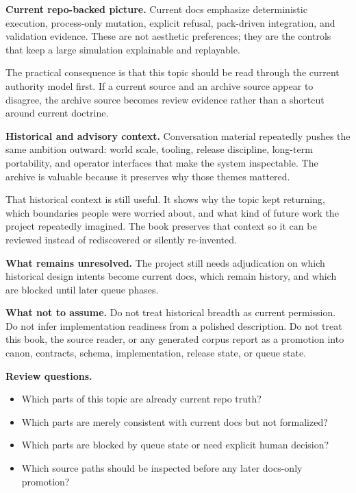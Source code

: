 \documentclass[10.5pt,a4paper,openany]{book}
\begin{document}
\textbf{Current repo-backed picture.} Current docs emphasize deterministic execution, process-\allowbreak{}only mutation, explicit refusal, pack-\allowbreak{}driven integration, and validation evidence.\allowbreak{} These are not aesthetic preferences; they are the controls that keep a large simulation explainable and replayable.\allowbreak{}


The practical consequence is that this topic should be read through the current authority model first.\allowbreak{} If a current source and an archive source appear to disagree, the archive source becomes review evidence rather than a shortcut around current doctrine.\allowbreak{}


\textbf{Historical and advisory context.} Conversation material repeatedly pushes the same ambition outward: world scale, tooling, release discipline, long-\allowbreak{}term portability, and operator interfaces that make the system inspectable.\allowbreak{} The archive is valuable because it preserves why those themes mattered.\allowbreak{}


That historical context is still useful.\allowbreak{} It shows why the topic kept returning, which boundaries people were worried about, and what kind of future work the project repeatedly imagined.\allowbreak{} The book preserves that context so it can be reviewed instead of rediscovered or silently re-\allowbreak{}invented.\allowbreak{}


\textbf{What remains unresolved.} The project still needs adjudication on which historical design intents become current docs, which remain history, and which are blocked until later queue phases.\allowbreak{}


\textbf{What not to assume.} Do not treat historical breadth as current permission.\allowbreak{} Do not infer implementation readiness from a polished description.\allowbreak{} Do not treat this book, the source reader, or any generated corpus report as a promotion into canon, contracts, schema, implementation, release state, or queue state.\allowbreak{}


\textbf{Review questions.}


\begin{itemize}
\item Which parts of this topic are already current repo truth?
\item Which parts are merely consistent with current docs but not formalized?
\item Which parts are blocked by queue state or need explicit human decision?
\item Which source paths should be inspected before any later docs-\allowbreak{}only promotion?
\end{itemize}
\end{document}

